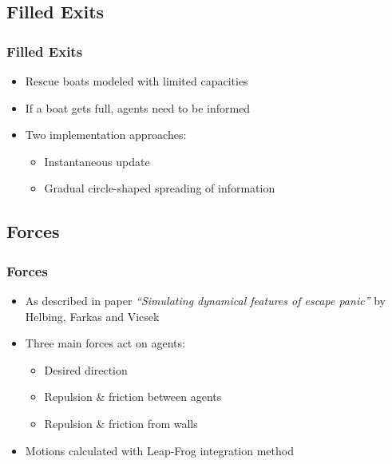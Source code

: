 \documentclass{beamer}
\begin{document}
\subsection{Filled Exits}
\begin{frame}
	\frametitle{Filled Exits}
	\begin{itemize}
		\item Rescue boats modeled with limited capacities
		\item If a boat gets full, agents need to be informed
		\item Two implementation approaches:
			\begin{itemize}
				\item Instantaneous update
				\item Gradual circle-shaped spreading of information
			\end{itemize}
	\end{itemize}
\end{frame}

\subsection{Forces}
\begin{frame}
	\frametitle{Forces}
	\begin{itemize}
		\item As described in paper \emph{``Simulating dynamical features
		      of escape panic''} by Helbing, Farkas and Vicsek
		\item Three main forces act on agents:
			\begin{itemize}
				\item Desired direction
				\item Repulsion \& friction between agents
				\item Repulsion \& friction from walls
			\end{itemize}
		\item Motions calculated with Leap-Frog integration method
	\end{itemize}

\end{frame}
\end{document}
